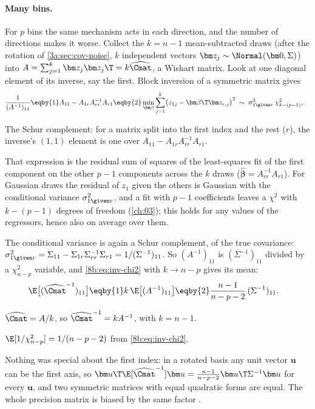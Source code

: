 \paragraph{Many bins.}
For $p$ bins the same mechanism acts in each direction, and the number of directions makes it worse.
Collect the $k=n-1$ mean-subtracted draws (after the rotation of \cref{3a:sec:cov-noise}, $k$ independent
vectors $\bm z_j\sim\Normal(\bm0,\Sigma)$) into $A=\sum_{j=1}^k\bm z_j\bm z_j\T=k\widehat\Cmat$, a Wishart matrix. Look at one
diagonal element of its inverse, say the first. Block inversion of a symmetric matrix gives
\begin{align}
  \frac1{(A^{-1})_{11}}
  &\eqby{1}A_{11}-A_{1r}A_{rr}^{-1}A_{r1}
   \eqby{2}\min_{\bm\beta}\sum_{j=1}^k\bigl(z_{1j}-\bm\beta\T\bm z_{r,j}\bigr)^2
   \;\sim\;\sigma^2_{1\given r}\,\chi^2_{k-(p-1)},
  \label{8b:eq:schur}
\end{align}
\begin{explain}
  \item The Schur complement: for a matrix split into the first index and the rest ($r$), the inverse's
        $(1,1)$ element is one over $A_{11}-A_{1r}A_{rr}^{-1}A_{r1}$.
  \item That expression is the residual sum of squares of the least-squares fit of the first component on
        the other $p-1$ components across the $k$ draws ($\hat{\bm\beta}=A_{rr}^{-1}A_{r1}$). For Gaussian draws the residual
        of $z_1$ given the others is Gaussian with the conditional variance $\sigma^2_{1\given r}$, and a fit with $p-1$
        coefficients leaves a $\chi^2$ with $k-(p-1)$ degrees of freedom (\cref{ch:03}); this holds for any values of
        the regressors, hence also on average over them.
\end{explain}
The conditional variance is again a Schur complement, of the true covariance:
$\sigma^2_{1\given r}=\Sigma_{11}-\Sigma_{1r}\Sigma_{rr}^{-1}\Sigma_{r1}=1/(\Sigma^{-1})_{11}$. So $(A^{-1})_{11}$ is $(\Sigma^{-1})_{11}$ divided by a
$\chi^2_{n-p}$ variable, and \eqref{8b:eq:inv-chi2} with $k\to n-p$ gives its mean:
\begin{align}
  \E\bigl[(\widehat\Cmat^{-1})_{11}\bigr]
  &\eqby{1}k\,\E\bigl[(A^{-1})_{11}\bigr]
   \eqby{2}\frac{n-1}{n-p-2}\,(\Sigma^{-1})_{11}.
  \label{8b:eq:hartlap-derived}
\end{align}
\begin{explain}
  \item $\widehat\Cmat=A/k$, so $\widehat\Cmat^{-1}=kA^{-1}$, with $k=n-1$.
  \item $\E[1/\chi^2_{n-p}]=1/(n-p-2)$ from \eqref{8b:eq:inv-chi2}.
\end{explain}
Nothing was special about the first index: in a rotated basis any unit vector $\bm u$ can be the first
axis, so $\bm u\T\E[\widehat\Cmat^{-1}]\bm u=\frac{n-1}{n-p-2}\bm u\T\Sigma^{-1}\bm u$ for every $\bm u$, and two symmetric matrices with
equal quadratic forms are equal. The whole precision matrix is biased by the same factor
\cite[eq.~16]{Hartlap2007}.

